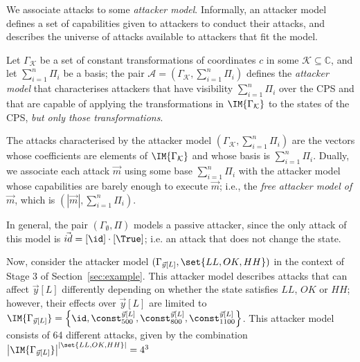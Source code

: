 {We associate attacks to some \emph{attacker model}.
Informally, an attacker model defines a set of capabilities given to attackers to conduct their attacks, and describes the universe of attacks available to attackers that fit the model. 
\begin{definition}
 Let $\Gamma_\mathcal{K}$ be a set of constant transformations of coordinates $c$ in some $\mathcal{K}\subseteq\mathbb{C}$, and let $\sum_{i=1}^n\Pi_i$ be a basis; the pair $\mathcal{A}=(\Gamma_{\mathcal{K}}, \sum_{i=1}^n\Pi_i)$ defines the \emph{attacker model} that characterises attackers that have visibility $\sum_{i=1}^n\Pi_i$ over the CPS and that are capable of applying the transformations in $\IM{\Gamma_\mathcal{K}}$ %
  to the states of the CPS, \emph{but only those transformations}. %
  
  The attacks characterised by the attacker model $(\Gamma_{\mathcal{K}}, \sum_{i=1}^n\Pi_i)$ are the vectors whose coefficients are elements of $\IM{\Gamma_\mathcal{K}}$ and whose basis is $\sum_{i=1}^n\Pi_i$. Dually, we associate each attack $\vec{m}$ using some base $\sum_{i=1}^n\Pi_i$ with the attacker model whose capabilities are barely enough to execute $\vec{m}$; i.e., the \emph{free attacker model of $\vec{m}$}, which is $(|\vec{m}|, \sum_{i=1}^n\Pi_i)$.
\end{definition}
\begin{example}
  In general, the pair $(\Gamma_{\emptyset}, \Pi)$ models a passive attacker, since the only attack of this model is $\vec{id}=[\id]\cdot[\True]$; i.e. an attack that does not change the state. %

  Now, consider the attacker model $(\Gamma_{\vec{y}[L]},\set{LL,OK,HH})$ in the context of Stage 3 of Section~\ref{sec:example}. This attacker model describes attacks that can affect $\vec{y}[L]$ differently depending on whether the state satisfies $LL$, $OK$ or $HH$; 
  however, their effects over $\vec{y}[L]$ are limited to $\IM{\Gamma_{\vec{y}[L]}}=\left\{\id, \const^{\vec{y}[L]}_{500}, \const^{\vec{y}[L]}_{800}, \const^{\vec{y}[L]}_{1100}\right\}$. This attacker model consists of 64 different attacks, given by the combination ${\left|\IM{\Gamma_{\vec{y}[L]}}\right|}^{\left|\set{LL,OK,HH}\right|}=4^3$
\end{example}

}

